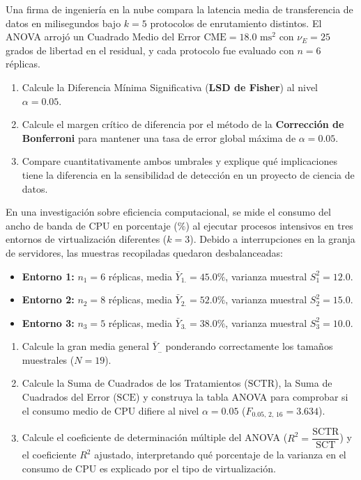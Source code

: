 \begin{problema}
	\label{prob:bonferroni_lsd}
	Una firma de ingeniería en la nube compara la latencia media de transferencia de datos en milisegundos bajo $k = 5$ protocolos de enrutamiento distintos. El ANOVA arrojó un Cuadrado Medio del Error $\text{CME} = 18.0$ $\text{ms}^2$ con $\nu_E = 25$ grados de libertad en el residual, y cada protocolo fue evaluado con $n = 6$ réplicas.
	\begin{enumerate}
		\item Calcule la Diferencia Mínima Significativa (\textbf{LSD de Fisher}) al nivel $\alpha = 0.05$.
		\item Calcule el margen crítico de diferencia por el método de la \textbf{Corrección de Bonferroni} para mantener una tasa de error global máxima de $\alpha = 0.05$.
		\item Compare cuantitativamente ambos umbrales y explique qué implicaciones tiene la diferencia en la sensibilidad de detección en un proyecto de ciencia de datos.
	\end{enumerate}
\end{problema}

\begin{problema}
	\label{prob:anova_oper_desbalanceado_r2}
	En una investigación sobre eficiencia computacional, se mide el consumo del ancho de banda de CPU en porcentaje ($\%$) al ejecutar procesos intensivos en tres entornos de virtualización diferentes ($k = 3$). Debido a interrupciones en la granja de servidores, las muestras recopiladas quedaron desbalanceadas:
	\begin{itemize}
		\item \textbf{Entorno 1:} $n_1 = 6$ réplicas, media $\bar{Y}_{1.} = 45.0\%$, varianza muestral $S_1^2 = 12.0$.
		\item \textbf{Entorno 2:} $n_2 = 8$ réplicas, media $\bar{Y}_{2.} = 52.0\%$, varianza muestral $S_2^2 = 15.0$.
		\item \textbf{Entorno 3:} $n_3 = 5$ réplicas, media $\bar{Y}_{3.} = 38.0\%$, varianza muestral $S_3^2 = 10.0$.
	\end{itemize}
	\begin{enumerate}
		\item Calcule la gran media general $\bar{Y}_{..}$ ponderando correctamente los tamaños muestrales ($N = 19$).
		\item Calcule la Suma de Cuadrados de los Tratamientos ($\text{SCTR}$), la Suma de Cuadrados del Error ($\text{SCE}$) y construya la tabla ANOVA para comprobar si el consumo medio de CPU difiere al nivel $\alpha = 0.05$ ($F_{0.05, \, 2, \, 16} = 3.634$).
		\item Calcule el coeficiente de determinación múltiple del ANOVA ($R^2 = \dfrac{\text{SCTR}}{\text{SCT}}$) y el coeficiente $R^2$ ajustado, interpretando qué porcentaje de la varianza en el consumo de CPU es explicado por el tipo de virtualización.
	\end{enumerate}
\end{problema}

